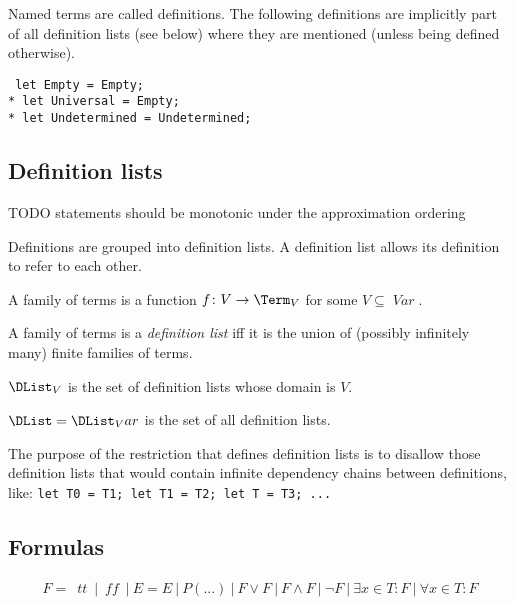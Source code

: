 \documentclass[oneside,12pt]{book}
\theoremstyle{definition}
\theoremstyle{remark}
\newcommand{\tde}{\raisebox{0.5ex}{\texttildelow}}
\newcommand\var[1]{\mathop{\mathit{#1}}\nolimits}
\newcommand{\Var}{\var{Var}}
\newcommand{\false}{\var{tt}}
\newcommand{\true}{\var{ff}}
\begin{document}
Named terms are called definitions. The following definitions are implicitly part
of all definition lists (see below) where they are mentioned (unless being defined
otherwise).

\begin{defBox}
  \texttt{%
    let Empty = Empty; \\*
    let Universal = \tde Empty; \\*
    let Undetermined = \tde Undetermined;
  }
\end{defBox}

\subsection{Definition lists}

TODO statements should be monotonic under the approximation ordering

Definitions are grouped into definition lists. A definition list allows its
definition to refer to each other.

\begin{defBox}
  A family of terms is a function $f\colon V \to \Term_V$ for some $V \subseteq \Var$.
  
  \medskip \noindent A family of terms is a \textit{definition list} iff it is the union
  of (possibly infinitely many) finite families of terms.
  
  \medskip \noindent $\DList_V$ is the set of definition lists whose domain is $V$.
  
  \noindent $\DList = \DList_Var$ is the set of all definition lists.
\end{defBox}

The purpose of the restriction that defines definition lists is to disallow those
definition lists that would contain infinite dependency chains between definitions,
like: \texttt{let T0 = T1; let T1 = T2; let T = T3; ...}

\subsection{Formulas}
\begin{align*}
  F = ~\false~|~\true~|~E = E~|~P(...)~|~F \lor F~|~F \land F~|~\neg F%
  ~|~\exists x \in T\colon F~|~\forall x\in T\colon F
\end{align*}
\end{document}
